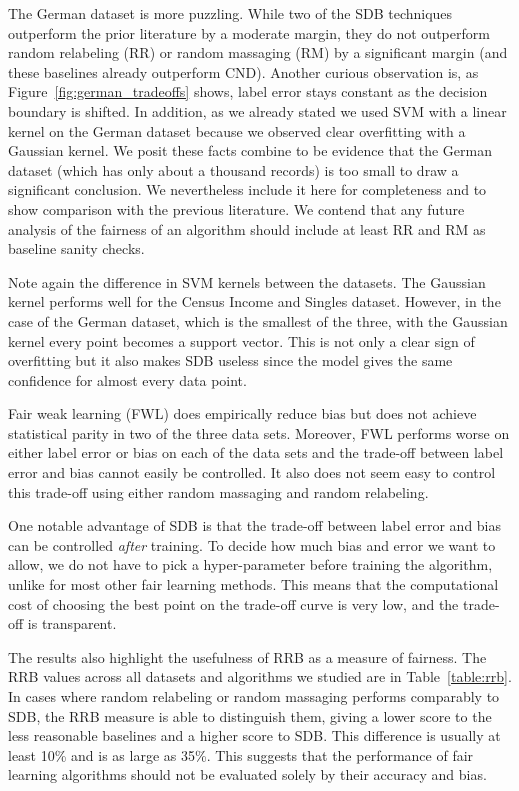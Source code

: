 \documentclass[twoside,leqno,twocolumn]{article}
\begin{document}
The German dataset is more puzzling. While two of the SDB techniques
outperform the prior literature by a moderate margin, they do not 
outperform random relabeling (RR) or random massaging (RM) by a significant
margin (and these baselines already outperform CND). Another curious
observation is, as Figure~\ref{fig:german_tradeoffs} shows, label error stays
constant as the decision boundary is shifted. In addition, as we already stated
we used SVM with a linear kernel on the German dataset because we observed
clear overfitting with a Gaussian kernel. We posit these facts combine to be
evidence that the German dataset (which has only about a thousand records) is
too small to draw a significant conclusion. We nevertheless include it here for
completeness and to show comparison with the previous literature. We contend
that any future analysis of the fairness of an algorithm should include at
least RR and RM as baseline sanity checks.

Note again the difference in SVM kernels between the datasets. The Gaussian
kernel performs well for the Census Income and Singles dataset. However, in
the case of the German dataset, which is the smallest of the three, with the
Gaussian kernel every point becomes a support vector. This is not only a clear
sign of overfitting but it also makes SDB useless since the model gives the
same confidence for almost every data point.

Fair weak learning (FWL) does empirically reduce bias but does not achieve
statistical parity in two of the three data sets.  Moreover, FWL performs worse
on either label error or bias on each of the data sets and the trade-off
between label error and bias cannot easily be controlled. It also does not seem
easy to control this trade-off using either random massaging and random
relabeling.
 
One notable advantage of SDB is that the trade-off between label error and bias
can be controlled \emph{after} training.  To decide how much bias and error we
want to allow, we do not have to pick a hyper-parameter before training the
algorithm, unlike for most other fair learning methods. This means that the
computational cost of choosing the best point on the trade-off curve is very
low, and the trade-off is transparent. 

The results also highlight the usefulness of RRB as a measure of fairness. The
RRB values across all datasets and algorithms we studied are in
Table~\ref{table:rrb}.  In cases where random relabeling or random massaging
performs comparably to SDB, the RRB measure is able to distinguish them, giving
a lower score to the less reasonable baselines and a higher score to SDB. This
difference is usually at least 10\% and is as large as 35\%. This suggests that
the performance of fair learning algorithms should not be evaluated solely by
their accuracy and bias.
\end{document}

